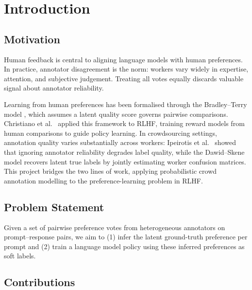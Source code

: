 \documentclass[11pt, a4paper]{article}
\begin{document}
\newpage

\section{Introduction}

\subsection{Motivation}

Human feedback is central to aligning language models with human preferences. In practice,
annotator disagreement is the norm: workers vary widely in expertise, attention, and
subjective judgement. Treating all votes equally discards valuable signal about annotator
reliability.

Learning from human preferences has been formalised through the Bradley--Terry model
\cite{bradley1952}, which assumes a latent quality score governs pairwise comparisons.
Christiano et al.\ \cite{christiano2017} applied this framework to RLHF, training reward
models from human comparisons to guide policy learning. In crowdsourcing settings,
annotation quality varies substantially across workers: Ipeirotis et al.\ \cite{ipeirotis2010}
showed that ignoring annotator reliability degrades label quality, while the Dawid--Skene
model \cite{dawid1979} recovers latent true labels by jointly estimating worker confusion
matrices. This project bridges the two lines of work, applying probabilistic crowd annotation
modelling to the preference-learning problem in RLHF.

\subsection{Problem Statement}

Given a set of pairwise preference votes from heterogeneous annotators on prompt--response
pairs, we aim to (1) infer the latent ground-truth preference per prompt and (2) train a
language model policy using these inferred preferences as soft labels.

\subsection{Contributions}
\end{document}
